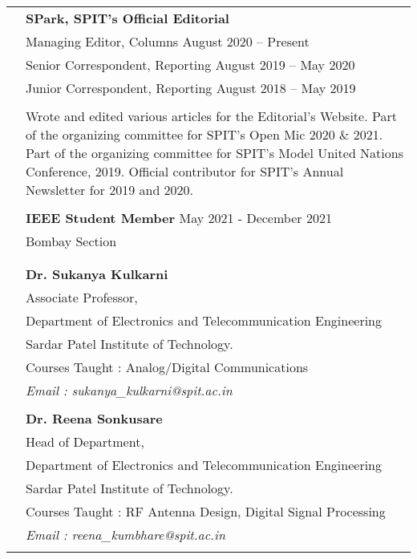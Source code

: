 \documentclass[letterpaper, 10pt]{article}
\begin{document}
\begin{longtable}{p{1.3in}p{4.8in}}

{\color{OliveGreen}{Professional}} 
& {\textbf{SPark, SPIT’s Official Editorial}} \hfill \\
{\color{OliveGreen}{Memberships}} 
& Managing Editor, Columns \hfill August 2020 – Present \\
& Senior Correspondent, Reporting \hfill August 2019 – May 2020\\
& Junior Correspondent, Reporting \hfill August 2018 – May 2019 \\
& \\
& Wrote and edited various articles for the Editorial’s Website. Part of the organizing committee for SPIT’s Open Mic 2020 \& 2021. Part of the organizing committee for SPIT’s Model United Nations Conference, 2019. Official contributor for SPIT’s Annual Newsletter for 2019 and 2020.\\
\\

& {\textbf{IEEE Student Member}} \hfill May 2021 - December 2021\\
& Bombay Section\\
& \\
\\

\nohyphens{\color{OliveGreen}{References}} 
& \textbf{Dr. Sukanya Kulkarni} \\
& Associate Professor,\\
& Department of Electronics and Telecommunication Engineering \\
& Sardar Patel Institute of Technology. \\
& Courses Taught : Analog/Digital Communications\\
& \textit{Email : sukanya\_kulkarni@spit.ac.in }\\
& \\

& \textbf{Dr. Reena Sonkusare} \\
& Head of Department,\\
& Department of Electronics and Telecommunication Engineering \\
& Sardar Patel Institute of Technology. \\
& Courses Taught : RF Antenna Design, Digital Signal Processing \\
& \textit{Email : reena\_kumbhare@spit.ac.in}\\
& \\


\end{longtable}
\end{document}
